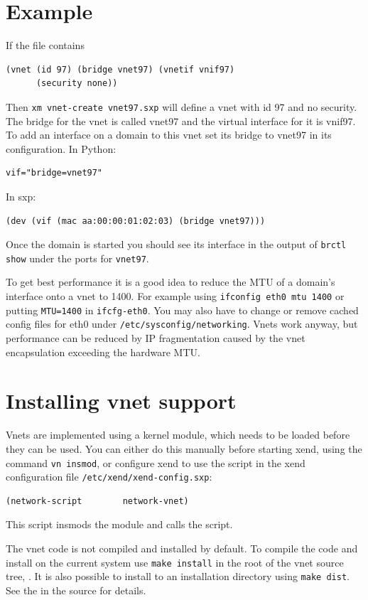 \documentclass[11pt,twoside,final,openright]{report}
\def\xend{{xend}\xspace}
\begin{document}
\section{Example}
If the file  contains
\begin{verbatim}
(vnet (id 97) (bridge vnet97) (vnetif vnif97)
      (security none))
\end{verbatim}
Then \texttt{xm vnet-create vnet97.sxp} will define a vnet with id 97 and no security.
The bridge for the vnet is called vnet97 and the virtual interface for it is vnif97.
To add an interface on a domain to this vnet set its bridge to vnet97
in its configuration. In Python:
\begin{verbatim}
vif="bridge=vnet97"
\end{verbatim}
In sxp:
\begin{verbatim}
(dev (vif (mac aa:00:00:01:02:03) (bridge vnet97)))
\end{verbatim}
Once the domain is started you should see its interface in the output of \texttt{brctl show}
under the ports for \texttt{vnet97}.

To get best performance it is a good idea to reduce the MTU of a domain's interface
onto a vnet to 1400. For example using \texttt{ifconfig eth0 mtu 1400} or putting
\texttt{MTU=1400} in \texttt{ifcfg-eth0}.
You may also have to change or remove cached config files for eth0 under
\texttt{/etc/sysconfig/networking}. Vnets work anyway, but performance can be reduced
by IP fragmentation caused by the vnet encapsulation exceeding the hardware MTU.

\section{Installing vnet support}
Vnets are implemented using a kernel module, which needs to be loaded before
they can be used. You can either do this manually before starting \xend, using the
command \texttt{vn insmod}, or configure \xend to use the 
script in the xend configuration file \texttt{/etc/xend/xend-config.sxp}:
\begin{verbatim}
(network-script        network-vnet)
\end{verbatim}
This script insmods the module and calls the  script.

The vnet code is not compiled and installed by default.
To compile the code and install on the current system
use \texttt{make install} in the root of the vnet source tree,
. It is also possible to install to an installation
directory using \texttt{make dist}. See the  in
the source for details.
\end{document}
